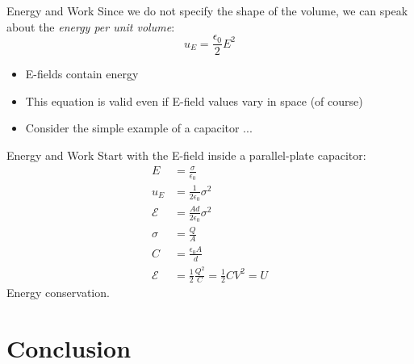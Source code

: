 \documentclass{beamer}
\begin{document}
\begin{frame}{Energy and Work}
Since we do not specify the shape of the volume, we can speak about the \textit{energy per unit volume}:
\begin{equation}
\boxed{
u_E = \frac{\epsilon_0}{2}E^2
}
\end{equation}
\begin{itemize}
\item E-fields contain energy
\item This equation is valid even if E-field values vary in space (of course)
\item Consider the simple example of a capacitor ...
\end{itemize}
\end{frame}

\begin{frame}{Energy and Work}
Start with the E-field inside a parallel-plate capacitor:
\begin{align}
E &= \frac{\sigma}{\epsilon_0} \\
u_E &= \frac{1}{2\epsilon_0}\sigma^2 \\
\mathcal{E} &= \frac{Ad}{2\epsilon_0}\sigma^2 \\
\sigma &= \frac{Q}{A} \\
C &= \frac{\epsilon_0 A}{d} \\
\mathcal{E} &= \frac{1}{2} \frac{Q^2}{C} = \frac{1}{2}C V^2 = U
\end{align}
Energy conservation.
\end{frame}

\section{Conclusion}
\end{document}
